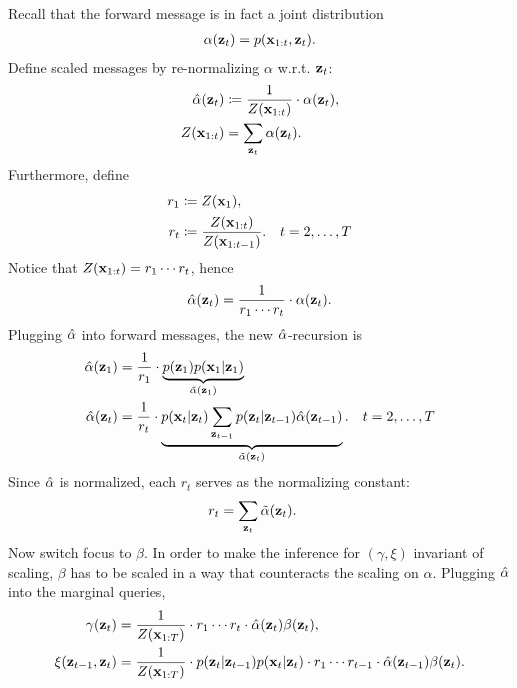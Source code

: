 \documentclass{article}
\begin{document}
\begin{enumerate}
Recall that the forward message is in fact a joint distribution 
\begin{align}
\alpha (\mathbf{z}_t) = p(\mathbf{x}_{1:t}, \mathbf{z}_t).
\end{align}
%
Define scaled messages by re-normalizing $ \alpha $ w.r.t. $ \mathbf{z}_t $:
\begin{align}
\hat{\alpha} (\mathbf{z}_t) 
& \coloneqq \frac{1}{Z(\mathbf{x}_{1:t})} \cdot \alpha (\mathbf{z}_t) , \\
Z(\mathbf{x}_{1:t}) 
& = \sum_{\mathbf{z}_t} \alpha (\mathbf{z}_t).
\end{align}
Furthermore, define 
\begin{align}
r_1 
& \coloneqq Z(\mathbf{x}_1) , \\
r_t 
& \coloneqq \frac{Z(\mathbf{x}_{1:t})}{Z(\mathbf{x}_{1:t-1})}.  \quad t = 2, \dotsc, T  \label{eqn:r-t}
\end{align}
Notice that $ Z(\mathbf{x}_{1:t}) = r_1 \cdots r_t $, hence
\begin{align}
\hat{\alpha} (\mathbf{z}_t) = \frac{1}{r_1 \cdots r_t} \cdot  \alpha (\mathbf{z}_t).
\end{align}
Plugging $ \hat{\alpha} $ into forward messages, the new $ \hat{\alpha} $-recursion is
\begin{align}
\hat{\alpha} (\mathbf{z}_1) 
& = \frac{1}{r_1} \cdot 
\underbrace{
p(\mathbf{z}_1) p(\mathbf{x}_1 | \mathbf{z}_1) 
}_{\tilde{\alpha} (\mathbf{z}_1)}\\
\hat{\alpha} (\mathbf{z}_t) 
& = \frac{1}{r_t} \cdot 
\underbrace{
p(\mathbf{x}_t | \mathbf{z}_t) \sum_{\mathbf{z}_{t-1}} p(\mathbf{z}_t | \mathbf{z}_{t-1})   \hat{\alpha} (\mathbf{z}_{t-1})
}_{\tilde{\alpha} (\mathbf{z}_t)}   . \quad t = 2, \dotsc, T
\end{align}
Since $ \hat{\alpha} $ is normalized, each $ r_t $ serves as the normalizing constant:
\begin{align}
r_t & =  \sum_{\mathbf{z}_t} \tilde{\alpha} (\mathbf{z}_t)  .
\end{align}
%
Now switch focus to $ \beta $.
In order to make the inference for $ (\gamma, \xi) $ invariant of scaling, $ \beta $ has to be scaled in a way that counteracts the scaling on $ \alpha $. 
Plugging $ \hat{\alpha} $ into the marginal queries,
\begin{align}
\gamma (\zvec_t) 
& = \frac{1}{Z(\xvec_{1:T})} \cdot r_1 \cdots r_t \cdot  \alphahat (\zvec_t) \beta (\zvec_t)  , \\
\xi(\zvec_{t-1}, \zvec_t) 
& = \frac{1}{Z(\xvec_{1:T})} \cdot p(\zvec_t | \zvec_{t-1}) p(\xvec_t | \zvec_t)   \cdot r_1 \cdots r_{t-1} \cdot  \alphahat  (\zvec_{t-1}) \beta (\zvec_t) .

\end{align}
\end{enumerate}
\end{document}
